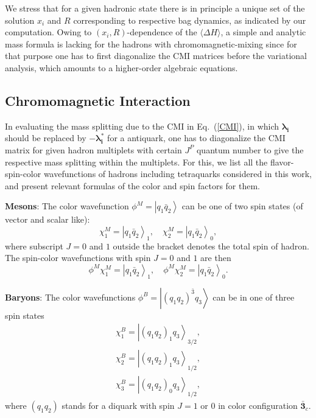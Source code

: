 \documentclass[12pt,onecolumn,floatfix,nofootinbib]{revtex4}
\begin{document}
We stress that for a given hadronic state there is in principle a unique set
of the solution $x_{i}$ and $R$ corresponding to respective bag dynamics, as
indicated by our computation. Owing to $(x_{i},R)$-dependence of the $%
\langle \Delta H \rangle$, a simple and analytic mass formula is lacking for
the hadrons with chromomagnetic-mixing since for that purpose one has to
first diagonalize the CMI matrices before the variational analysis, which
amounts to a higher-order algebraic equations.

\subsection{Chromomagnetic Interaction}

In evaluating the mass splitting due to the CMI in Eq.~(\ref{CMI}), in which
$\boldsymbol{\lambda _{i}}$ should be replaced by $-\boldsymbol{\lambda
_{i}^{\ast }}$ for a antiquark, one has to diagonalize the CMI matrix for
given hadron multiplets with certain $J^{P}$ quantum number to give the
respective mass splitting \cite{Luo:2017eub} within the multiplets. For
this, we list all the flavor-spin-color wavefunctions of hadrons including
tetraquarks considered in this work, and present relevant formulas of the
color and spin factors for them.

\textbf{Mesons}: The color wavefunction $\phi ^{M}=\left\vert q_{1}\bar{q}%
_{2}\right\rangle $ can be one of two spin states (of vector and scalar
like):
\begin{equation}
\chi _{1}^{M}={\left\vert q_{1}\bar{q}_{2}\right\rangle }_{1},\quad \chi
_{2}^{M}={\left\vert q_{1}\bar{q}_{2}\right\rangle }_{0},  \label{spinM}
\end{equation}%
where subscript $J=0$ and $1$ outside the bracket denotes the total spin of
hadron. The spin-color wavefunctions with spin $J=0$ and $1$ are then
\begin{equation}
\phi ^{M}\chi _{1}^{M}={\left\vert q_{1}\bar{q}_{2}\right\rangle }_{1},\quad
\phi ^{M}\chi _{2}^{M}={\left\vert q_{1}\bar{q}_{2}\right\rangle }_{0}.
\label{colorspinM}
\end{equation}

\textbf{Baryons}: The color wavefunctions $\phi ^{B}=\left\vert {\left(
q_{1}q_{2}\right) }^{\bar{3}}q_{3}\right\rangle $ can be in one of three
spin states
\begin{equation}
\begin{aligned} \chi_{1}^{B}={\left| {\left(q_{1}q_{2}\right)}_{1} q_{3}
\right\rangle}_{3/2}, \\ \chi_{2}^{B}={\left| {\left(q_{1}q_{2}\right)}_{1}
q_{3} \right\rangle}_{1/2}, \\ \chi_{3}^{B}={\left|
{\left(q_{1}q_{2}\right)}_{0} q_{3} \right\rangle}_{1/2}, \end{aligned}
\label{spinB}
\end{equation}%
where $\left( q_{1}q_{2}\right) $ stands for a diquark with spin $J=1$ or $0$
in color configuration $\boldsymbol{\bar{3}}_{c}$.
\end{document}
